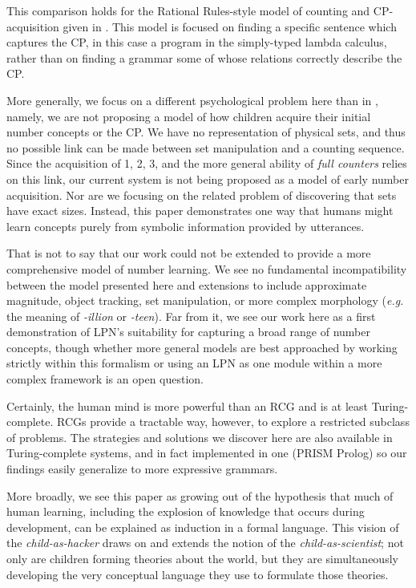 \documentclass[10pt,letterpaper]{article}
\begin{document}
This comparison holds for the Rational Rules-style model of counting
and CP-acquisition given in \citep{PianGoodTen2012}. This model is
focused on finding a specific sentence which captures the CP, in this
case a program in the simply-typed lambda calculus, rather than on
finding a grammar some of whose relations correctly describe the CP.

More generally, we focus on a different psychological problem here
than in \citep{PianGoodTen2012}, namely, we are not proposing a model
of how children acquire their initial number concepts or the CP. We
have no representation of physical sets, and thus no possible link can
be made between set manipulation and a counting sequence. Since the
acquisition of 1, 2, 3, and the more general ability of \emph{full
  counters} relies on this link, our current system is not being
proposed as a model of early number acquisition. Nor are we focusing
on the related problem of discovering that sets have exact sizes.
Instead, this paper demonstrates one way that humans might learn
concepts purely from symbolic information provided by utterances.

That is not to say that our work could not be extended to provide a
more comprehensive model of number learning. We see no fundamental
incompatibility between the model presented here and extensions to
include approximate magnitude, object tracking, set manipulation, or
more complex morphology ({\it e.g.} the meaning of \emph{-illion} or
\emph{-teen}). Far from it, we see our work here as a first
demonstration of LPN's suitability for capturing a broad range of
number concepts, though whether more general models are best
approached by working strictly within this formalism or using an LPN
as one module within a more complex framework is an open question.

Certainly, the human mind is more powerful than an RCG and is at least
Turing-complete. RCGs provide a tractable way, however, to explore a
restricted subclass of problems. The strategies and solutions we
discover here are also available in Turing-complete systems, and in
fact implemented in one (PRISM Prolog) so our findings easily
generalize to more expressive grammars.

More broadly, we see this paper as growing out of the hypothesis that
much of human learning, including the explosion of knowledge that
occurs during development, can be explained as induction in a formal
language. This vision of the \emph{child-as-hacker} draws on and
extends the notion of the \emph{child-as-scientist}; not only are
children forming theories about the world, but they are simultaneously
developing the very conceptual language they use to formulate those
theories.
\end{document}
